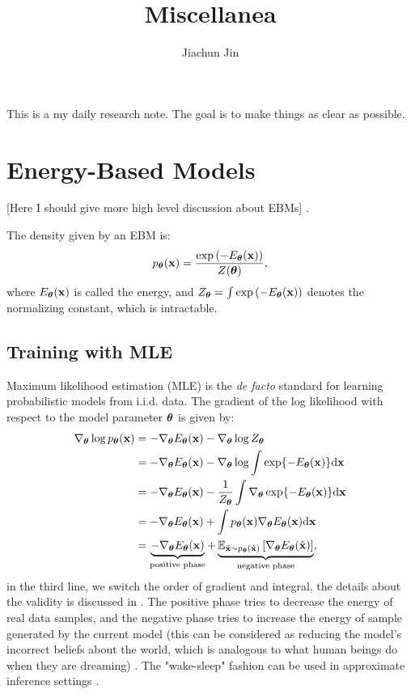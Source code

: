 \documentclass{article}
\title{\textbf{\Large Miscellanea}}
\author{Jiachun Jin}
\affil{\textit{\small School of Information Science and Technology}}
\affil{\textit{\small ShanghaiTech University}}
\date{}
\begin{document}
\maketitle
This is a my daily research note. The goal is to make things as clear as possible.

\tableofcontents

\section{Energy-Based Models}
[Here I should give more high level discussion about EBMs] \citep{lecun2006tutorial, song2021train}.

The density given by an EBM is:
\begin{equation}
    p_{\bm{\theta}}({\mathbf{x}}) = \frac{\exp\left( -E_{\bm{\theta}}({\mathbf{x}}) \right)}{Z({\bm{\theta}})},
\end{equation}
where $ E_{\bm{\theta}}({\mathbf{x}}) $ is called the energy, and $ Z_{{\bm{\theta}}} = \int \exp\left( -E_{\bm{\theta}}({\mathbf{x}}) \right)$ denotes the normalizing constant, which is intractable.
\subsection{Training with MLE}
Maximum likelihood estimation (MLE) is the \textit{de facto} standard for learning probabilistic models from i.i.d. data. The gradient of the log likelihood with respect to the model parameter ${\bm{\theta}}$ is given by:
\begin{equation}\label{eq.MLE}
    \begin{aligned}
        \nabla_{{\bm{\theta}}}\log p_{\bm{\theta}}({\mathbf{x}})
        &= -\nabla_{\bm{\theta}} E_{\bm{\theta}}({\mathbf{x}}) - \nabla_{\bm{\theta}} \log Z_{\bm{\theta}} \\
        &= -\nabla_{\bm{\theta}} E_{\bm{\theta}}({\mathbf{x}}) - \nabla_{\bm{\theta}} \log \int \exp\{ -E_{\bm{\theta}}({\mathbf{x}}) \}\mathrm{d}{\mathbf{x}} \\
        &= -\nabla_{\bm{\theta}} E_{\bm{\theta}}({\mathbf{x}}) - \frac{1}{Z_{\bm{\theta}}} \int \nabla_{\bm{\theta}} \exp\{ -E_{\bm{\theta}}({\mathbf{x}}) \}\mathrm{d}{\mathbf{x}} \\
        &= -\nabla_{\bm{\theta}} E_{\bm{\theta}}({\mathbf{x}}) + \int p_{\bm{\theta}}({\mathbf{x}})\nabla_{\bm{\theta}} E_{\bm{\theta}}({\mathbf{x}})\mathrm{d}{\mathbf{x}} \\
        &= \underbrace{-\nabla_{\bm{\theta}} E_{\bm{\theta}}({\mathbf{x}})}_{\text{positive phase}} + \underbrace{\mathbb{E}_{\tilde{{\mathbf{x}}} \sim p_{\bm{\theta}}(\tilde{{\mathbf{x}}})}\left[ \nabla_{\bm{\theta}} E_{\bm{\theta}}(\tilde{{\mathbf{x}}}) \right]}_{\text{negative phase}},
    \end{aligned}
\end{equation}
in the third line, we switch the order of gradient and integral, the details about the validity is discussed in . The positive phase tries to decrease the energy of real data samples, and the negative phase tries to increase the energy of sample generated by the current model (this can be considered as reducing the model's incorrect beliefs about the world, which is analogous to what human beings do when they are dreaming) \citep[Section~18.2]{deeplearningbook}. The "wake-sleep" fashion can be used in approximate inference settings \citep[Section~19.5]{deeplearningbook}.
\end{document}
